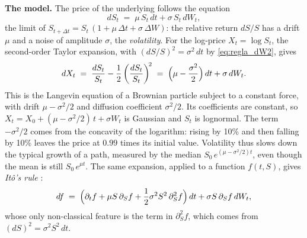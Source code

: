 \noindent\textbf{The model.}
The price of the underlying follows the equation
\begin{equation}\label{eq:bs_eds_P}
  dS_t \;=\; \mu\, S_t\, dt + \sigma\, S_t\, dW_t,
\end{equation}
the limit of $S_{t+\Delta t} = S_t\,(1 + \mu\,\Delta t + \sigma\,\Delta W)$:
the relative return $dS/S$ has a drift $\mu$ and a noise of amplitude
$\sigma$, the \emph{volatility}. For the log-price $X_t = \log S_t$, the
second-order Taylor expansion, with $(dS/S)^2 = \sigma^2\,dt$ by
\eqref{eq:regla_dW2}, gives
\begin{equation}\label{eq:logprecio_P}
  dX_t \;=\; \frac{dS_t}{S_t} - \frac{1}{2}\left(\frac{dS_t}{S_t}\right)^{\!2}
  \;=\; \Bigl(\mu - \frac{\sigma^2}{2}\Bigr)\, dt + \sigma\, dW_t .
\end{equation}
This is the Langevin equation of a Brownian particle subject to a
constant force, with drift $\mu - \sigma^2/2$ and diffusion coefficient
$\sigma^2/2$. Its coefficients are constant, so
$X_t = X_0 + (\mu - \sigma^2/2)\,t + \sigma W_t$ is Gaussian and $S_t$
is lognormal. The term $-\sigma^2/2$ comes from the concavity of the
logarithm: rising by 10\% and then falling by 10\% leaves the price at
$0.99$ times its initial value. Volatility thus slows down the typical
growth of a path, measured by the median $S_0\,e^{(\mu - \sigma^2/2)t}$,
even though the mean is still $S_0\,e^{\mu t}$. The same expansion,
applied to a function $f(t, S)$, gives \emph{Itô's rule}
\cite[Section~4.3]{tfgm}:
\begin{equation}\label{eq:regla_ito}
  df \;=\; \Bigl(\partial_t f + \mu S\, \partial_S f
  + \frac{1}{2}\sigma^2 S^2\, \partial_S^2 f\Bigr)\, dt
  + \sigma S\, \partial_S f\, dW_t ,
\end{equation}
whose only non-classical feature is the term in $\partial_S^2 f$, which
comes from $(dS)^2 = \sigma^2 S^2\,dt$.

\medskip

